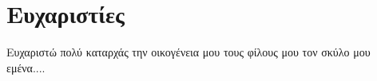 \chapter*{Ευχαριστίες}{
Ευχαριστώ πολύ καταρχάς την οικογένεια μου τους φίλους μου τον σκύλο μου εμένα....
}
\hfill 
